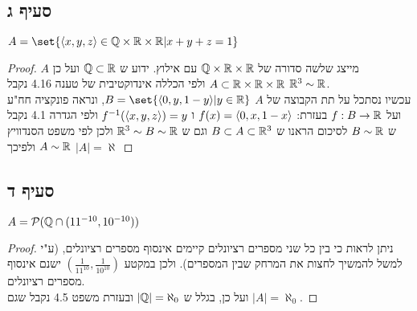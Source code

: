 \documentclass{article}
\DeclarePairedDelimiter\set\{\}
\begin{document}
	\subsection*{סעיף ג}
	$A = \set{\ang{x,y,z} \in \QQ \times \RR \times \RR | x + y + z = 1}$
	\begin{proof}
		$A$ מייצג שלשה סדורה של $\mathbb{Q} \times \mathbb{R} \times \mathbb{R}$ עם אילוץ. ידוע ש $\mathbb{Q} \subset \mathbb{R}$ ועל כן $A \subset \mathbb{R} \times \mathbb{R} \times \mathbb{R}$
		ולפי הכללה אינדוקטיבית של טענה 4.16 נקבל $\mathbb{R}^3 \sim \mathbb{R}$. \\
		עכשיו נסתכל על תת הקבוצה של $A$ $B = \set{\ang{0, y, 1-y} | y \in \RR}$, ונראה פונקציה חח"ע ועל $f: B \to \mathbb{R}$ בעזרת: $f(x) = \langle 0,x,1-x \rangle$ ו $f^{-1}(\langle x,y,z \rangle) = y$
		ולפי הגדרה 4.1 נקבל ש $B \sim \mathbb{R}$
		לסיכום הראנו ש $B \subset A \subset \mathbb{R}^3$ וגם ש $\mathbb{R}^3 \sim B \sim \mathbb{R}$ ולכן לפי משפט הסנדוויץ $A \sim \mathbb{R}$
		ולפיכך $|A| = \aleph$
	\end{proof}

	\subsection*{סעיף ד}
	$A = \mathcal{P}(\mathbb{Q} \cap (11^{-10}, 10^{-10}))$
	\begin{proof}
		ניתן לראות כי בין כל שני מספרים רציונלים קיימים אינסוף מספרים רציונלים, (ע"י למשל להמשיך לחצות את המרחק שבין המספרים).
		ולכן במקטע $(\frac{1}{11^{10}}, \frac{1}{10^{10}})$ ישנם אינסוף מספרים רציונלים. \\
		ועל כן, בגלל ש $|\mathbb{Q}| = \aleph_0$ ובעזרת משפט 4.5 נקבל שגם $|A| = \aleph_0$.
	\end{proof}

	\pagebreak
\end{document}
